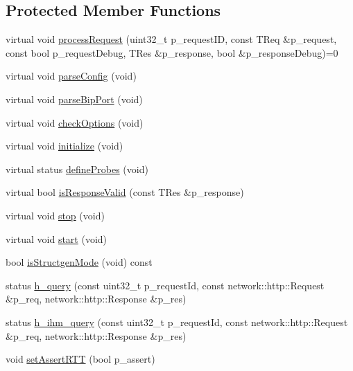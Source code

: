 \subsection*{Protected Member Functions}
\begin{DoxyCompactItemize}
\item 
virtual void \hyperlink{classxtd_1_1servers_1_1app_1_1Server_ad3c9fd71ba0399f18c27b15cb1d28e65}{process\+Request} (uint32\+\_\+t p\+\_\+request\+ID, const T\+Req \&p\+\_\+request, const bool p\+\_\+request\+Debug, T\+Res \&p\+\_\+response, bool \&p\+\_\+response\+Debug)=0
\item 
virtual void \hyperlink{classxtd_1_1servers_1_1app_1_1Server_a04ac2d5b3a0a229a3b54ef33b9b7056d}{parse\+Config} (void)
\item 
virtual void \hyperlink{classxtd_1_1servers_1_1app_1_1Server_aeb01b34fd4e8564b8cd18c2041dc253f}{parse\+Bip\+Port} (void)
\item 
virtual void \hyperlink{classxtd_1_1servers_1_1app_1_1Server_a6f5fff5c5058dc43aea7b27a046c985b}{check\+Options} (void)
\item 
virtual void \hyperlink{classxtd_1_1servers_1_1app_1_1Server_aabde8b6a3810b09f029821dddafe3b8c}{initialize} (void)
\item 
virtual status \hyperlink{classxtd_1_1servers_1_1app_1_1Server_afbe76a86e66e635907229d37b1267037}{define\+Probes} (void)
\item 
virtual bool \hyperlink{classxtd_1_1servers_1_1app_1_1Server_a00c2f9aaa3c130299a4c77f86bf37d38}{is\+Response\+Valid} (const T\+Res \&p\+\_\+response)
\item 
virtual void \hyperlink{classxtd_1_1servers_1_1app_1_1Server_a37fe0eca660f81a9edde0c1ce6938f39}{stop} (void)
\item 
virtual void \hyperlink{classxtd_1_1servers_1_1app_1_1Server_a8e21bf6e7993a2e04fd70d0ce88ca487}{start} (void)
\item 
bool \hyperlink{classxtd_1_1servers_1_1app_1_1Server_ad1161e88fb26561ffbef7254fb263d15}{is\+Structgen\+Mode} (void) const 
\item 
status \hyperlink{classxtd_1_1servers_1_1app_1_1Server_ae4ad855e88777c7e5afe9d673037ca6b}{h\+\_\+query} (const uint32\+\_\+t p\+\_\+request\+Id, const network\+::http\+::\+Request \&p\+\_\+req, network\+::http\+::\+Response \&p\+\_\+res)
\item 
status \hyperlink{classxtd_1_1servers_1_1app_1_1Server_a10fc93bccaf973467b0df7de87b4ae79}{h\+\_\+ihm\+\_\+query} (const uint32\+\_\+t p\+\_\+request\+Id, const network\+::http\+::\+Request \&p\+\_\+req, network\+::http\+::\+Response \&p\+\_\+res)
\item 
void \hyperlink{classxtd_1_1servers_1_1app_1_1Server_ab6700b87291ddfa7de81f11ec4f866e6}{set\+Assert\+R\+TT} (bool p\+\_\+assert)
\end{DoxyCompactItemize}
